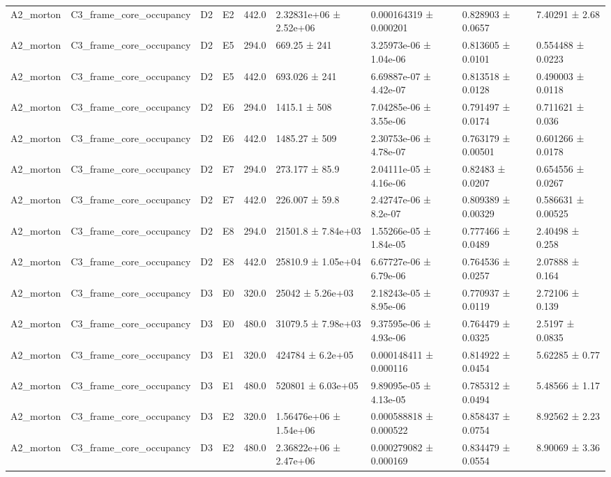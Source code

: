 \begin{table}
\begin{tabular}{lllllllll}
A2\_morton & C3\_frame\_core\_occupancy & D2 & E2 & 442.0 & 2.32831e+06 ± 2.52e+06 & 0.000164319 ± 0.000201 & 0.828903 ± 0.0657 & 7.40291 ± 2.68 \\
A2\_morton & C3\_frame\_core\_occupancy & D2 & E5 & 294.0 & 669.25 ± 241 & 3.25973e-06 ± 1.04e-06 & 0.813605 ± 0.0101 & 0.554488 ± 0.0223 \\
A2\_morton & C3\_frame\_core\_occupancy & D2 & E5 & 442.0 & 693.026 ± 241 & 6.69887e-07 ± 4.42e-07 & 0.813518 ± 0.0128 & 0.490003 ± 0.0118 \\
A2\_morton & C3\_frame\_core\_occupancy & D2 & E6 & 294.0 & 1415.1 ± 508 & 7.04285e-06 ± 3.55e-06 & 0.791497 ± 0.0174 & 0.711621 ± 0.036 \\
A2\_morton & C3\_frame\_core\_occupancy & D2 & E6 & 442.0 & 1485.27 ± 509 & 2.30753e-06 ± 4.78e-07 & 0.763179 ± 0.00501 & 0.601266 ± 0.0178 \\
A2\_morton & C3\_frame\_core\_occupancy & D2 & E7 & 294.0 & 273.177 ± 85.9 & 2.04111e-05 ± 4.16e-06 & 0.82483 ± 0.0207 & 0.654556 ± 0.0267 \\
A2\_morton & C3\_frame\_core\_occupancy & D2 & E7 & 442.0 & 226.007 ± 59.8 & 2.42747e-06 ± 8.2e-07 & 0.809389 ± 0.00329 & 0.586631 ± 0.00525 \\
A2\_morton & C3\_frame\_core\_occupancy & D2 & E8 & 294.0 & 21501.8 ± 7.84e+03 & 1.55266e-05 ± 1.84e-05 & 0.777466 ± 0.0489 & 2.40498 ± 0.258 \\
A2\_morton & C3\_frame\_core\_occupancy & D2 & E8 & 442.0 & 25810.9 ± 1.05e+04 & 6.67727e-06 ± 6.79e-06 & 0.764536 ± 0.0257 & 2.07888 ± 0.164 \\
A2\_morton & C3\_frame\_core\_occupancy & D3 & E0 & 320.0 & 25042 ± 5.26e+03 & 2.18243e-05 ± 8.95e-06 & 0.770937 ± 0.0119 & 2.72106 ± 0.139 \\
A2\_morton & C3\_frame\_core\_occupancy & D3 & E0 & 480.0 & 31079.5 ± 7.98e+03 & 9.37595e-06 ± 4.93e-06 & 0.764479 ± 0.0325 & 2.5197 ± 0.0835 \\
A2\_morton & C3\_frame\_core\_occupancy & D3 & E1 & 320.0 & 424784 ± 6.2e+05 & 0.000148411 ± 0.000116 & 0.814922 ± 0.0454 & 5.62285 ± 0.77 \\
A2\_morton & C3\_frame\_core\_occupancy & D3 & E1 & 480.0 & 520801 ± 6.03e+05 & 9.89095e-05 ± 4.13e-05 & 0.785312 ± 0.0494 & 5.48566 ± 1.17 \\
A2\_morton & C3\_frame\_core\_occupancy & D3 & E2 & 320.0 & 1.56476e+06 ± 1.54e+06 & 0.000588818 ± 0.000522 & 0.858437 ± 0.0754 & 8.92562 ± 2.23 \\
A2\_morton & C3\_frame\_core\_occupancy & D3 & E2 & 480.0 & 2.36822e+06 ± 2.47e+06 & 0.000279082 ± 0.000169 & 0.834479 ± 0.0554 & 8.90069 ± 3.36 \\

\end{tabular}
\end{table}
